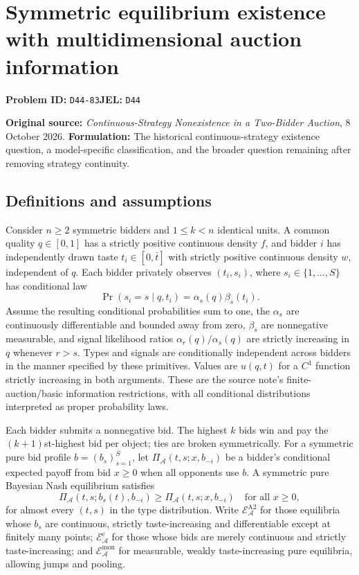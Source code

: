\documentclass[11pt,a4paper]{article}
\begin{document}
\section*{Symmetric equilibrium existence with multidimensional auction information}
\textbf{Problem ID:} \texttt{D44-83}\quad \textbf{JEL:} \texttt{D44}\par
\label{problem:OP-0592}
\label{supp:auction-existence}

\noindent\textbf{Original source:} \emph{Continuous-Strategy Nonexistence
	in a Two-Bidder Auction}, 8 October 2026.
\textbf{Formulation:} The historical continuous-strategy existence
question, a model-specific classification, and the broader question
remaining after removing strategy continuity.

\subsection*{Definitions and assumptions}

Consider $n\ge2$ symmetric bidders and $1\le k<n$ identical units.
A common quality $q\in[0,1]$ has a strictly positive continuous
density $f$, and bidder $i$ has independently drawn taste
$t_i\in[0,\bar t]$ with strictly positive continuous density $w$,
independent of $q$. Each bidder privately observes $(t_i,s_i)$,
where $s_i\in\{1,\ldots,S\}$ has conditional law
\[
\Pr(s_i=s\mid q,t_i)=\alpha_s(q)\beta_s(t_i).
\]
Assume the resulting conditional probabilities sum to one, the
$\alpha_s$ are continuously differentiable and bounded away from zero,
$\beta_s$ are nonnegative measurable, and signal likelihood ratios
$\alpha_r(q)/\alpha_s(q)$ are strictly increasing in $q$ whenever
$r>s$. Types and signals are conditionally independent across bidders
in the manner specified by these primitives. Values are
$u(q,t)$ for a $C^1$ function strictly increasing in both arguments.
These are the source note's finite-auction/basic information
restrictions, with all conditional distributions interpreted as proper
probability laws.

Each bidder submits a nonnegative bid. The highest $k$ bids win and
pay the $(k+1)$st-highest bid per object; ties are broken symmetrically.
For a symmetric pure bid profile $b=(b_s)_{s=1}^S$, let
$\Pi_{\mathcal A}(t,s;x,b_{-i})$ be a bidder's conditional expected
payoff from bid $x\ge0$ when all opponents use $b$.
A symmetric pure Bayesian Nash equilibrium satisfies
\[
\Pi_{\mathcal A}(t,s;b_s(t),b_{-i})
\ge \Pi_{\mathcal A}(t,s;x,b_{-i})
\quad\text{for all }x\ge0,
\]
for almost every $(t,s)$ in the type distribution. Write
$\mathcal E_{\mathcal A}^{\mathrm{A2}}$ for those equilibria whose
$b_s$ are continuous, strictly taste-increasing and differentiable
except at finitely many points;
$\mathcal E_{\mathcal A}^{\mathrm c}$ for those whose bids are merely
continuous and strictly taste-increasing; and
$\mathcal E_{\mathcal A}^{\mathrm{mon}}$ for measurable, weakly
taste-increasing pure equilibria, allowing jumps and pooling.
\end{document}
